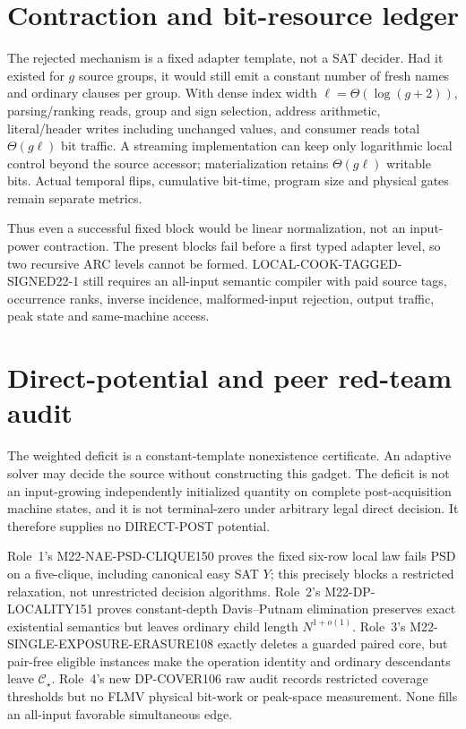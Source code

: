 \documentclass[11pt]{article}
\newcommand{\CS}{\mathcal C_\star}
\begin{document}
\section{Contraction and bit-resource ledger}
The rejected mechanism is a fixed adapter template, not a SAT decider.  Had it existed for $g$ source groups, it would still emit a constant number of fresh names and ordinary clauses per group.  With dense index width $\ell=\Theta(\log(g+2))$, parsing/ranking reads, group and sign selection, address arithmetic, literal/header writes including unchanged values, and consumer reads total $\Theta(g\ell)$ bit traffic.  A streaming implementation can keep only logarithmic local control beyond the source accessor; materialization retains $\Theta(g\ell)$ writable bits.  Actual temporal flips, cumulative bit-time, program size and physical gates remain separate metrics.

Thus even a successful fixed block would be linear normalization, not an input-power contraction.  The present blocks fail before a first typed adapter level, so two recursive ARC levels cannot be formed.  LOCAL-COOK-TAGGED-SIGNED22-1 still requires an all-input semantic compiler with paid source tags, occurrence ranks, inverse incidence, malformed-input rejection, output traffic, peak state and same-machine access.

\section{Direct-potential and peer red-team audit}
The weighted deficit is a constant-template nonexistence certificate.  An adaptive solver may decide the source without constructing this gadget.  The deficit is not an input-growing independently initialized quantity on complete post-acquisition machine states, and it is not terminal-zero under arbitrary legal direct decision.  It therefore supplies no DIRECT-POST potential.

Role~1's M22-NAE-PSD-CLIQUE150 proves the fixed six-row local law fails PSD on a five-clique, including canonical easy SAT $Y$; this precisely blocks a restricted relaxation, not unrestricted decision algorithms.  Role~2's M22-DP-LOCALITY151 proves constant-depth Davis--Putnam elimination preserves exact existential semantics but leaves ordinary child length $N^{1+o(1)}$.  Role~3's M22-SINGLE-EXPOSURE-ERASURE108 exactly deletes a guarded paired core, but pair-free eligible instances make the operation identity and ordinary descendants leave $\CS$.  Role~4's new DP-COVER106 raw audit records restricted coverage thresholds but no FLMV physical bit-work or peak-space measurement.  None fills an all-input favorable simultaneous edge.
\end{document}
